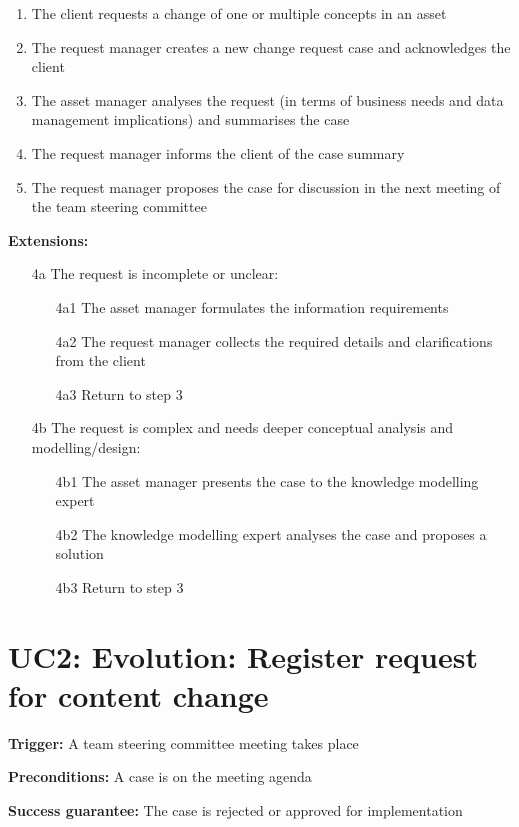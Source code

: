 	\begin{enumerate}
		\item The client requests a change of one or multiple concepts in an asset
		\item The request manager creates a new change request case and acknowledges the client
		\item The asset manager analyses the request (in terms of business needs and data management implications) and summarises the case
		\item The request manager informs the client of the case summary
		\item The request manager proposes the case for discussion in the next meeting of the team steering committee		
	\end{enumerate}
	\textbf{Extensions:}
	\begin{enumerate}
		\item [4a] The request is incomplete or unclear:
		\begin{enumerate}
			\item [4a1] The asset manager formulates the information requirements			
			\item [4a2] The request manager collects the required details and clarifications from the client
			\item [4a3] Return to step 3 
		\end{enumerate}
		\item [4b] The request is complex and needs deeper conceptual analysis and modelling/design:
		\begin{enumerate}
			\item [4b1] The asset manager presents the case to the knowledge modelling expert 
			\item [4b2] The knowledge modelling expert analyses the case and proposes a solution
			\item [4b3] Return to step 3			
		\end{enumerate}
	\end{enumerate}
	
	
	\section{UC2: Evolution: Register request for content change}
	\label{sec:uc2}
	
	\textbf{Trigger:} A team steering committee meeting takes place 
	
	\textbf{Preconditions:} A case is on the meeting agenda 
	
	\textbf{Success guarantee:} The case is rejected or approved for implementation
	
